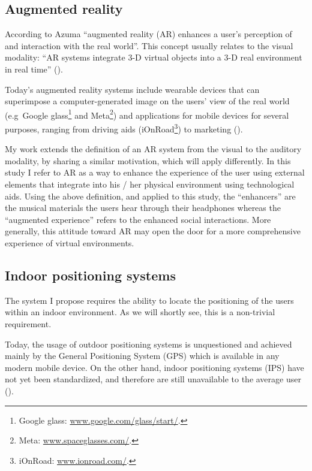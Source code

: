 \documentclass[a4paper,11pt]{article}
\begin{document}
\subsection{Augmented reality} \label{literature:ar}

According to Azuma ``augmented reality (AR) enhances a user's perception of and interaction with the real world''.
This concept usually relates to the visual modality: ``AR systems integrate 3-D virtual objects into a 3-D real environment in real time'' (\cite{azuma97}).

Today's augmented reality systems include wearable devices that can superimpose a computer-generated image on the users' view of the real world (e.g\ Google glass\footnote{Google glass: \href{http://www.google.com/glass/start/}{www.google.com/glass/start/}.} and Meta\footnote{Meta: \href{https://www.spaceglasses.com/}{www.spaceglasses.com/}.}) and applications for mobile devices for several purposes, ranging from driving aids (iOnRoad\footnote{iOnRoad: \href{http://www.ionroad.com/}{www.ionroad.com/}.}) to marketing (\cite{ikea}).

My work extends the definition of an AR system from the visual to the auditory modality, by sharing a similar motivation, which will apply differently.
In this study I refer to AR as a way to enhance the experience of the user using external elements that integrate into his / her physical environment using technological aids.
Using the above definition, and applied to this study, the ``enhancers'' are the musical materials the users hear through their headphones whereas the ``augmented experience'' refers to the enhanced social interactions.
More generally, this attitude toward AR may open the door for a more comprehensive experience of virtual environments.

\subsection{Indoor positioning systems} \label{literature:ips}

The system I propose requires the ability to locate the positioning of the users within an indoor environment.
As we will shortly see, this is a non-trivial requirement.

Today, the usage of outdoor positioning systems is unquestioned and achieved mainly by the General Positioning System (GPS) which is available in any modern mobile device.
On the other hand, indoor positioning systems (IPS) have not yet been standardized, and therefore are still unavailable to the average user (\cite{web:turetsky}).
\end{document}
